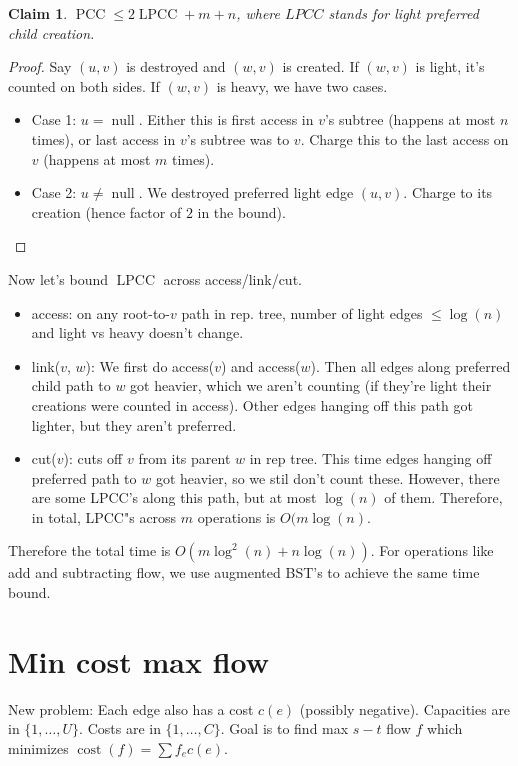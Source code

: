\documentclass[11pt]{article}
\newtheorem{claim}[theorem]{Claim}
\newcommand{\on}{\operatorname}
\begin{document}
\begin{claim}
    $\on{PCC}\leq 2\on{LPCC} + m + n$, where $LPCC$ stands for light preferred child creation.
\end{claim}
\begin{proof}
    Say $(u,v)$ is destroyed and $(w,v)$ is created.
    If $(w,v)$ is light, it's counted on both sides.
    If $(w,v)$ is heavy, we have two cases.
    \begin{itemize}
        \item Case 1: $u = \on{null}$. Either this is first access in $v$'s subtree (happens at most $n$ times), or last access in $v$'s subtree was to $v$. Charge this to the last access on $v$ (happens at most $m$ times).
        \item Case 2: $u\neq \on{null}$. We destroyed preferred light edge $(u,v)$. Charge to its creation (hence factor of $2$ in the bound).
    \end{itemize}
\end{proof}

Now let's bound $\on{LPCC}$ across access/link/cut.
\begin{itemize}
    \item access: on any root-to-$v$ path in rep. tree, number of light edges $\leq \log(n)$ and light vs heavy doesn't change.
    \item link($v$, $w$): We first do access($v$) and access($w$). Then all edges along preferred child path to $w$ got heavier, which we aren't counting (if they're light their creations were counted in access). Other edges hanging off this path got lighter, but they aren't preferred.
    \item cut($v$): cuts off $v$ from its parent $w$ in rep tree. This time edges hanging off preferred path to $w$ got heavier, so we stil don't count these. However, there are some LPCC's along this path, but at most $\log(n)$ of them. Therefore, in total, LPCC"s across $m$ operations is $O(m\log(n)$.
\end{itemize}
Therefore the total time is $O(m\log^2(n) + n\log(n))$.
For operations like add and subtracting flow, we use augmented BST's to achieve the same time bound.

\section{Min cost max flow}
New problem: Each edge also has a cost $c(e)$ (possibly negative). Capacities are in $\{1,\ldots, U\}$. Costs are in $\{1,\ldots,C\}$. Goal is to find max $s-t$ flow $f$ which
minimizes $\on{cost}(f) = \sum f_e c(e)$.
\end{document}
